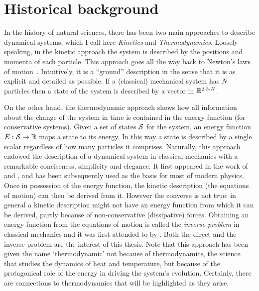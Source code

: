 % 
\section{Historical background}
In the history of natural sciences,
there has been two main approaches to describe dynamical systems,
which I call here
\emph{Kinetics} and \emph{Thermodynamics}.
Loosely speaking, in the kinetic approach the system is
described by the positions and momenta of each particle.
This approach goes all the way back to
Newton's laws of motion~\citep{newton}.
Intuitively, it is a ``ground'' description in the sense that
it is as explicit and detailed as possible.
If a (classical) mechanical system has $N$ particles
then a state of the system is described by
a vector in $\mathbb{R}^{2 \cdot 3 \cdot N}$.

On the other hand,
the thermodynamic approach shows how
all information about the change of the system in time
is contained in the energy function (for conservative systems).
Given a set of states $\mathcal{S}$ for the system,
an energy function $E: \mathcal{S} \to \mathbb{R}$ maps a state to its energy.
In this way a state is described by a single scalar
regardless of how many particles it comprises.
Naturally, this approach endowed the description of
a dynamical system in classical mechanics
with a remarkable conciseness, simplicity and elegance.
It first appeared in the work of
\citet{lagrange2} and \citet{hamilton},
and has been subsequently used as the basis for most of modern physics.
Once in possession of the energy function,
the kinetic description (\ie the equations of motion)
can then be derived from it. %
However the converse is not true:
in general a kinetic description might not have an energy function
from which it can be derived, %
partly because of non-conservative (\eg dissipative) forces.
Obtaining an energy function from the equations of motion
is called the \emph{inverse problem} in classical mechanics
\citep{santilli} and it was first attended to by \citet{helmholtz}.
Both the direct and the inverse problem are the interest of this thesis.
Note that this approach has been given the name `thermodynamic'
not because of thermodynamics,
the science that studies the dynamics of heat and temperature,
but because of the protagonical role of the energy
in driving the system's evolution.
Certainly, there are connections to thermodynamics
that will be highlighted as they arise.

